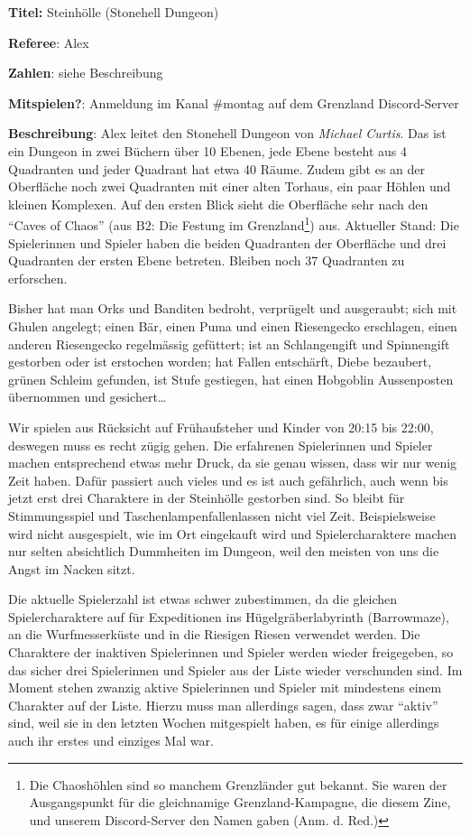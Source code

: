 \documentclass[11pt]{wbzine}
\begin{document}
\begin{multicols}{2}
    \textbf{Titel:} Steinhölle (Stonehell Dungeon) 
	
    \textbf{Referee}: Alex
    
    \textbf{Zahlen}: siehe Beschreibung

    \textbf{Mitspielen?}: Anmeldung im Kanal \#montag auf dem
    Grenzland Discord-Server

    \textbf{Beschreibung}: Alex leitet den Stonehell Dungeon von
    \textit{Michael Curtis}. Das ist ein Dungeon in zwei Büchern
    über 10 Ebenen, jede Ebene besteht aus 4 Quadranten und jeder
    Quadrant hat etwa 40 Räume. Zudem gibt es an der Oberfläche noch
    zwei Quadranten mit einer alten Torhaus, ein paar Höhlen und
    kleinen Komplexen. Auf den ersten Blick sieht die Oberfläche
    sehr nach den “Caves of Chaos” (aus B2: Die Festung im
    Grenzland\footnote{Die Chaoshöhlen sind so manchem Grenzländer
    gut bekannt. Sie waren der Ausgangspunkt für die gleichnamige
    Grenzland-Kampagne, die diesem Zine, und unserem Discord-Server
    den Namen gaben (Anm. d. Red.)}) aus. Aktueller Stand: Die
    Spielerinnen und Spieler haben die beiden Quadranten der
    Oberfläche und drei Quadranten der ersten Ebene betreten.
    Bleiben noch 37 Quadranten zu erforschen.

    Bisher hat man Orks und Banditen bedroht, verprügelt und
    ausgeraubt; sich mit Ghulen angelegt; einen Bär, einen Puma und
    einen Riesengecko erschlagen, einen anderen Riesengecko
    regelmässig gefüttert; ist an Schlangengift und Spinnengift
    gestorben oder ist erstochen worden; hat Fallen entschärft,
    Diebe bezaubert, grünen Schleim gefunden, ist Stufe gestiegen,
    hat einen Hobgoblin Aussenposten übernommen und gesichert…

    Wir spielen aus Rücksicht auf Frühaufsteher und Kinder von 20:15
    bis 22:00, deswegen muss es recht zügig gehen. Die erfahrenen
    Spielerinnen und Spieler machen entsprechend etwas mehr Druck,
    da sie genau wissen, dass wir nur wenig Zeit haben. Dafür
    passiert auch vieles und es ist auch gefährlich, auch wenn bis
    jetzt erst drei Charaktere in der Steinhölle gestorben sind. So
    bleibt für Stimmungsspiel und Taschenlampenfallenlassen nicht
    viel Zeit. Beispielsweise wird nicht ausgespielt, wie im Ort
    eingekauft wird und Spielercharaktere machen nur selten
    absichtlich Dummheiten im Dungeon, weil den meisten von uns die
    Angst im Nacken sitzt.

    Die aktuelle Spielerzahl ist etwas schwer zubestimmen, da die
    gleichen Spielercharaktere auf für Expeditionen ins
    Hügelgräberlabyrinth (Barrowmaze), an die Wurfmesserküste und in
    die Riesigen Riesen verwendet werden. Die Charaktere der
    inaktiven Spielerinnen und Spieler werden wieder freigegeben, so
    das sicher drei Spielerinnen und Spieler aus der Liste wieder
    verschunden sind. Im Moment stehen zwanzig aktive Spielerinnen
    und Spieler mit mindestens einem Charakter auf der Liste. Hierzu
    muss man allerdings sagen, dass zwar “aktiv” sind, weil sie in
    den letzten Wochen mitgespielt haben, es für einige allerdings
    auch ihr erstes und einziges Mal war.


\end{multicols}
\end{document}

